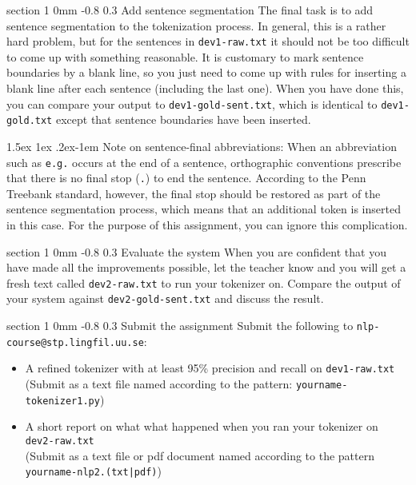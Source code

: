 \documentclass[11pt]{article}
\makeatletter
\newcommand{\newsec}[2]{\section{#1}\label{sec:#2}\noindent}
\renewcommand{\section}{\@startsection
{section}%
{1}%
{0mm}%
{-0.8\baselineskip}%
{0.3\baselineskip}%
{\bfseries\large}}%
\renewcommand{\paragraph}{%
  \@startsection{paragraph}{4}%
  {\z@}{1.5ex \@plus 1ex \@minus .2ex}{-1em}%
  {\normalfont\normalsize\bfseries}%
}\makeatother
\makeatother
\begin{document}
\newsec{Add sentence segmentation}{sent}%
The final task is to add sentence segmentation to the tokenization process. In general, this is a rather hard problem, but for the sentences in {\tt dev1-raw.txt} it should not be too difficult to come up with something reasonable. It is customary to mark sentence boundaries by a blank line, so you just need to come up with rules for inserting a blank line after each sentence (including the last one). When you have done this, you can compare your output to {\tt dev1-gold-sent.txt}, which is identical to {\tt dev1-gold.txt} except that sentence boundaries have been inserted.

\paragraph{Note on sentence-final abbreviations:} When an abbreviation such as {\tt e.g.} occurs at the end of a sentence, orthographic conventions prescribe 
that there is no final stop ({\tt .}) to end the sentence. According to the Penn Treebank standard, however, the final stop should be restored as part
of the sentence segmentation process, which means that an additional token is inserted in this case. For the purpose of this assignment, you can ignore 
this complication.

\newsec{Evaluate the system}{eval}%
When you are confident that you have made all the improvements possible, let the teacher know and you will get a fresh text called {\tt dev2-raw.txt} to run your tokenizer on.
Compare the output of your system against {\tt dev2-gold-sent.txt} and discuss the result.

\newsec{Submit the assignment}{submit}%
Submit the following to {\tt nlp-course@stp.lingfil.uu.se}: 
\begin{itemize}[noitemsep,topsep=0.2cm]
\item A refined tokenizer with at least 95\% precision and recall on {\tt dev1-raw.txt}\\
(Submit as a text file named according to the pattern: {\tt yourname-tokenizer1.py})
\item A short report on what what happened when you ran your tokenizer on {\tt dev2-raw.txt}\\
(Submit as a text file or pdf document named according to the pattern {\tt yourname-nlp2.(txt|pdf)})\\
\end{itemize}
\end{document}

